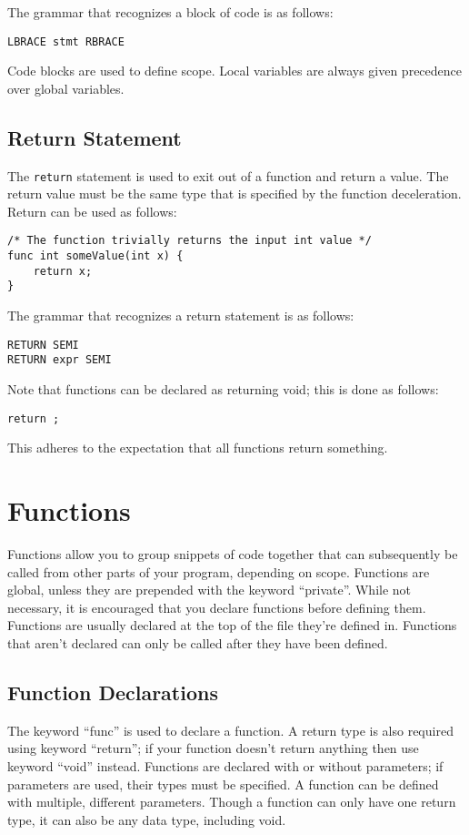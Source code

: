 \documentclass{article}
\begin{document}
The grammar that recognizes a block of code is as follows:
\begin{Verbatim}[frame=single]
LBRACE stmt RBRACE
\end{Verbatim}

Code blocks are used to define scope. Local variables are always given precedence over global variables. 

\subsection{Return Statement}
The \texttt{return} statement is used to exit out of a function and return a value.  The return value must be the same type that is specified by the function deceleration.  Return can be used as follows:

\begin{lstlisting}
/* The function trivially returns the input int value */
func int someValue(int x) {
	return x;
}
\end{lstlisting}

The grammar that recognizes a return statement is as follows:
\begin{Verbatim}[frame=single]
RETURN SEMI
RETURN expr SEMI
\end{Verbatim}

Note that functions can be declared as returning void; this is done as follows: 
\begin{lstlisting}
return ;
\end{lstlisting}
This adheres to the expectation that all functions return something.

\section{Functions}
Functions allow you to group snippets of code together that can subsequently be called from other parts of your program, depending on scope. Functions are global, unless they are prepended with the keyword ``private''. While not necessary, it is encouraged that you declare functions before defining them. Functions are usually declared at the top of the file they're defined in. Functions that aren't declared can only be called after they have been defined. 

\subsection{Function Declarations}

The keyword ``func'' is used to declare a function. A return type is also required using keyword ``return''; if your function doesn't return anything then use keyword ``void'' instead.  Functions are declared with or without parameters; if parameters are used, their types must be specified. A function can be defined with multiple, different parameters. Though a function can only have one return type, it can also be any data type, including void.
\end{document}
